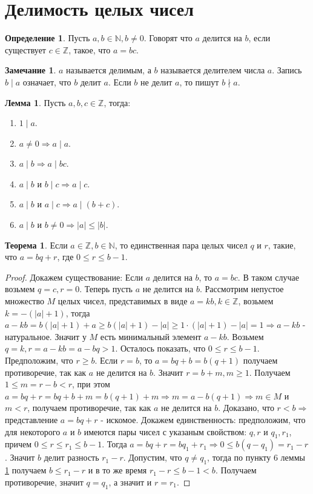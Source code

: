 \documentclass[a4paper, 12pt]{article}
\newcommand{\N}{\mathbb{N}}
\newcommand{\Z}{\mathbb{Z}}
\newcommand{\ndiv}{\nmid}
\theoremstyle{definition}
\newtheorem{definition}{Определение}[section]
\newtheorem{theorem}{Теорема}[section]
\newtheorem{lemma}{Лемма}[section]
\newtheorem*{comm}{Замечание}
\begin{document}
    \section{Делимость целых чисел}
    \begin{definition}
        Пусть $a,b\in \mathbb{N}, b\ne 0$. Говорят что $a$ делится на $b$, если существует $c\in \mathbb{Z}$, такое, что $a=bc$.
    \end{definition}
    \begin{comm}
        $a$ называется делимым, а $b$ называется делителем числа $a$. Запись $b \mid a$ означает, что $b$ делит $a$. Если $b$ не делит $a$, то пишут $b\ndiv a$.
    \end{comm}
    \begin{lemma} \label{lemma1.1}
        Пусть $a,b,c \in \mathbb{Z}$, тогда:
        \begin{enumerate}
            \item $1 \mid a$.
            \item $a\ne 0 \Rightarrow a\mid a$.
            \item $a\mid b \Rightarrow a\mid bc$.
            \item $a\mid b$ и $b\mid c \Rightarrow a\mid c$.
            \item $a\mid b$ и $a\mid c \Rightarrow a\mid (b+c)$.
            \item $a\mid b$ и $b\ne 0 \Rightarrow |a|\leq|b|$.
        \end{enumerate}
    \end{lemma}
    \begin{theorem} \label{th1.1}
        Если $a\in \Z, b\in \N$, то  единственная пара целых чисел $q$ и $r$, такие, что $a=bq+r$, где $0\leq r\leq b-1$. 
    \end{theorem}
    \begin{proof}
        Докажем существование: Если $a$ делится на $b$, то $a=bc$. В таком случае возьмем $q=c, r=0$. Теперь пусть $a$ не делится на $b$. Рассмотрим непустое множество $M$ целых чисел, представимых в виде $a=kb, k\in \mathbb{Z}$, возьмем $k=-(|a|+1)$, тогда $a-kb=b(|a|+1)+a\geq b(|a|+1)-|a|\geq 1\cdot (|a|+1)-|a|=1 \Rightarrow a-kb$ - натуральное. Значит у $M$ есть минимальный элемент $a-kb$. Возьмем $q=k, r=a-kb=a-bq > 1$. Осталось показать, что $0\leq r\leq b-1$. Предположим, что $r\geq b$. Если $r=b$, то $a=bq+b=b(q+1)$ получаем противоречие, так как $a$ не делится на $b$. Значит $r=b+m, m\geq 1$. Получаем $1\leq m=r-b<r$, при этом $a=bq+r=bq+b+m=b(q+1)+m \Rightarrow m=a-b(q+1) \Rightarrow m\in M$ и $m<r$, получаем противоречие, так как $a$ не делится на $b$. Доказано, что $r<b \Rightarrow$ представление $a=bq+r$ - искомое. Докажем единственность: предположим, что для некоторого $a$ и $b$ имеются пары чисел с указаным свойством: $q,r$ и $q_1,r_1$, причем $0\leq r\leq r_1 \leq b-1$. Тогда $a=bq+r=bq_1+r_1\Rightarrow 0\leq b(q-q_1)=r_1-r$. Значит $b$ делит разность $r_1-r$. Допустим, что $q\ne q_1$, тогда по пункту 6 леммы \ref{lemma1.1} получаем $b\leq r_1-r$ и в то же время $r_1-r\leq b-1<b$. Получаем противоречие, значит $q=q_1$, а значит и $r=r_1$.
    \end{proof}
\end{document}
